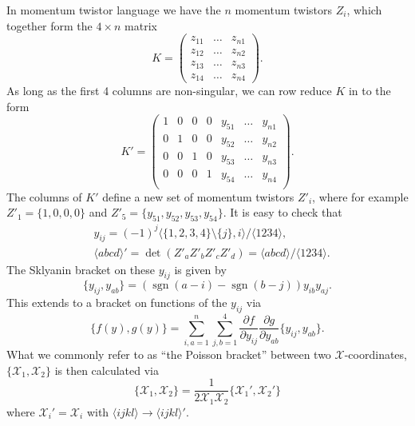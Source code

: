 \documentclass[12pt]{article}
\DeclareMathOperator{\sgn}{sgn}
\def\ket#1{\langle #1 \rangle}
\begin{document}
\thispagestyle{fancyplain}
 
\fancyhf{}
 
\cfoot{\fancyplain{}{\thepage}}


In momentum twistor language we have the $n$ momentum twistors $Z_i$, which together form the $4 \times n$ matrix
\begin{equation}	
K = \left(\begin{array}{ccc}
z_{11} & \ldots & z_{n1} \\
z_{12} & \ldots & z_{n2} \\
z_{13} & \ldots & z_{n3} \\
z_{14} & \ldots & z_{n4}\end{array}\right).
\end{equation}
As long as the first 4 columns are non-singular, we can row reduce $K$ in to the form
\begin{equation}
K'=\left(
\begin{array}{ccccccc}
 1 & 0 & 0 & 0 & y_{51} & \ldots  & y_{n1} \\
 0 & 1 & 0 & 0 & y_{52} & \ldots  & y_{n2} \\
 0 & 0 & 1 & 0 & y_{53} & \ldots  & y_{n3} \\
 0 & 0 & 0 & 1 & y_{54} & \ldots  & y_{n4} \\
\end{array}
\right).
\end{equation}
The columns of $K'$ define a new set of momentum twistors $Z'_i$, where for example $Z'_1 = \{1,0,0,0\}$ and $Z'_5 = \{y_{51},y_{52},y_{53},y_{54}\}$. It is easy to check that 
\begin{align}
	&y_{ij} = (-1)^j \ket{\{1,2,3,4\}\setminus\{j\},i}/\ket{1234},\label{eq:numerics}\\
	&\ket{abcd}' = \det(Z'_a Z'_b Z'_c Z'_d) = \ket{abcd}/\ket{1234}.
\end{align}
The Sklyanin bracket on these $y_{ij}$ is given by
\begin{equation}
	\{y_{ij},y_{ab}\} = (\sgn(a-i) - \sgn(b-j)) y_{ib} y_{aj}.
\end{equation}
This extends to a bracket on functions of the $y_{ij}$ via
\begin{equation}\label{def:sklyanin}
	\{f(y), g(y)\} =  \sum_{i,a=1}^n\sum_{j,b=1}^4\frac{\partial f}{\partial y_{ij}}  \frac{\partial g}{\partial y_{ab}} 
\{y_{ij}, y_{ab}\}.
\end{equation}
What we commonly refer to as ``the Poisson bracket'' between two $\mathcal{X}$-coordinates, $\{\mathcal{X}_1,\mathcal{X}_2\}$ is then calculated via
\begin{equation}
	\{\mathcal{X}_1,\mathcal{X}_2\} = \frac{1}{2 \mathcal{X}_1\mathcal{X}_2} \{\mathcal{X}_1',\mathcal{X}_2'\}
\end{equation}
where $\mathcal{X}_i' = \mathcal{X}_i$ with $\ket{ijkl} \to \ket{ijkl}'$. 
\end{document}
